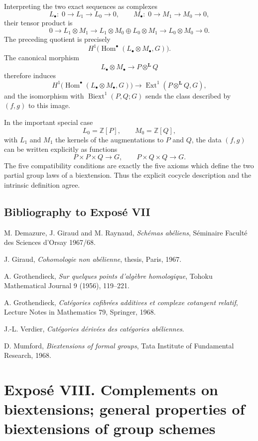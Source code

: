\documentclass[11pt]{article}
\newcommand{\bZ}{\mathbb Z}
\newcommand{\bL}{\mathbf L}
\newcommand{\Ext}{\operatorname{Ext}}
\newcommand{\Hom}{\operatorname{Hom}}
\newcommand{\Biext}{\operatorname{Biext}}
\begin{document}
Interpreting the two exact sequences as complexes
\[
L_\bullet:\;0\to L_1\to L_0\to 0,\qquad
M_\bullet:\;0\to M_1\to M_0\to 0,
\]
their tensor product is
\[
0\to L_1\otimes M_1\to
L_1\otimes M_0\oplus L_0\otimes M_1
\to L_0\otimes M_0\to 0.
\]
The preceding quotient is precisely
\[
H^1\bigl(\Hom^\bullet(L_\bullet\otimes M_\bullet,G)\bigr).
\]
The canonical morphism
\[
L_\bullet\otimes M_\bullet\longrightarrow P\otimes^{\bL}Q
\]
therefore induces
\[
H^1\bigl(\Hom^\bullet(L_\bullet\otimes M_\bullet,G)\bigr)
\longrightarrow
\Ext^1(P\otimes^{\bL}Q,G),
\]
and the isomorphism with \(\Biext^1(P,Q;G)\) sends the class described by
\((f,g)\) to this image.

In the important special case
\[
L_0=\bZ[P],\qquad M_0=\bZ[Q],
\]
with \(L_1\) and \(M_1\) the kernels of the augmentations to \(P\) and \(Q\),
the data \((f,g)\) can be written explicitly as functions
\[
P\times P\times Q\to G,\qquad P\times Q\times Q\to G.
\]
The five compatibility conditions are exactly the five axioms which define the
two partial group laws of a biextension. Thus the explicit cocycle description
and the intrinsic definition agree.

\subsection*{Bibliography to Exposé VII}

\begin{enumerate}[label={[\arabic*]}]
\item M. Demazure, J. Giraud and M. Raynaud, \emph{Schémas abéliens}, Séminaire
Faculté des Sciences d'Orsay 1967/68.
\item J. Giraud, \emph{Cohomologie non abélienne}, thesis, Paris, 1967.
\item A. Grothendieck, \emph{Sur quelques points d'algèbre homologique}, Tohoku
Mathematical Journal 9 (1956), 119--221.
\item A. Grothendieck, \emph{Catégories cofibrées additives et complexe
cotangent relatif}, Lecture Notes in Mathematics 79, Springer, 1968.
\item J.-L. Verdier, \emph{Catégories dérivées des catégories abéliennes}.
\item D. Mumford, \emph{Biextensions of formal groups}, Tata Institute of
Fundamental Research, 1968.
\end{enumerate}

\clearpage
\section*{Exposé VIII. Complements on biextensions; general properties of biextensions of group schemes}
\end{document}

